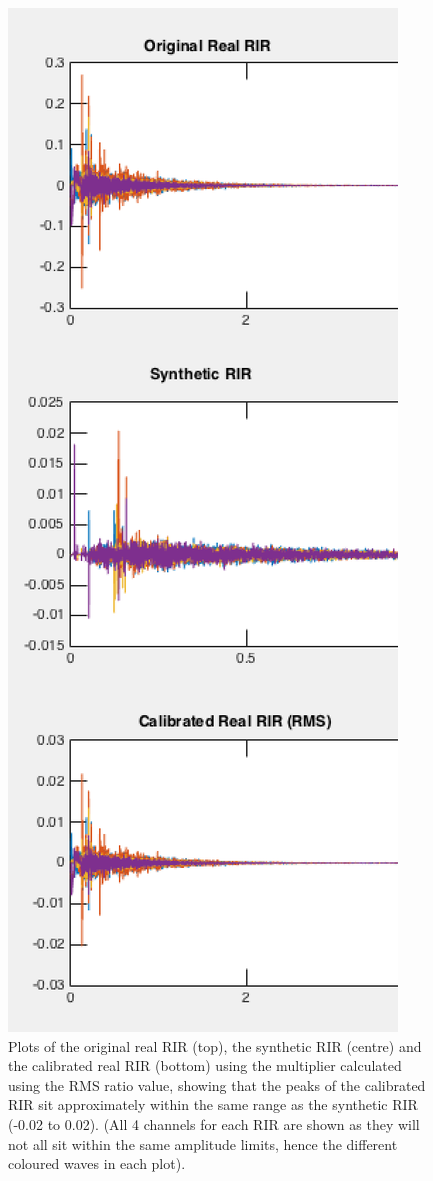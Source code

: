 \documentclass[../../main.tex]{subfiles}
\begin{document}
			\begin{figure}[t]
				\begin{center}
					\includegraphics[scale = 0.25]{Sections/Implementation/RealRIRs/images/calibration/CalRMS_RIR_edit2.png} 
					\caption{Plots of the original real \ac{RIR} (top), the synthetic \ac{RIR} (centre) and the calibrated real \ac{RIR} (bottom) using the multiplier calculated using the RMS ratio value, showing that the peaks of the calibrated \ac{RIR} sit approximately within the same range as the synthetic \ac{RIR} (-0.02 to 0.02). (All 4 channels for each \ac{RIR} are shown as they will not all sit within the same amplitude limits, hence the different coloured waves in each plot).}
					\label{calRMS}
				\end{center}
			\end{figure}
\end{document}
